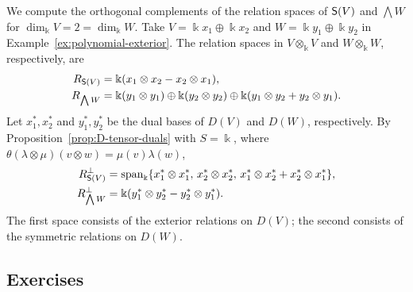 \begin{example}\label{ex:symmetric-orthogonals}
We compute the orthogonal complements of the relation spaces of $\mathsf{S}(V)$ and $\bigwedge W$ for $\dim_{\Bbbk}V=2=\dim_{\Bbbk}W$.
Take $V=\Bbbk x_1\oplus\Bbbk x_2$ and $W=\Bbbk y_1\oplus\Bbbk y_2$ in Example~\ref{ex:polynomial-exterior}.
The relation spaces in $V\otimes_\Bbbk V$ and $W\otimes_\Bbbk W$, respectively, are
\[
\begin{aligned}
R_{\mathsf{S}(V)}&=\Bbbk(x_1\otimes x_2-x_2\otimes x_1),\\
R_{\bigwedge W}&=\Bbbk(y_1\otimes y_1)\oplus\Bbbk(y_2\otimes y_2)\oplus\Bbbk(y_1\otimes y_2+y_2\otimes y_1).
\end{aligned}
\]
Let $x_1^*,x_2^*$ and $y_1^*,y_2^*$ be the dual bases of $D(V)$ and $D(W)$, respectively.
By Proposition~\ref{prop:D-tensor-duals} with $S=\Bbbk$, where $\theta(\lambda\otimes\mu)(v\otimes w)=\mu(v)\lambda(w)$,
\[
\begin{aligned}
R_{\mathsf{S}(V)}^\perp&=\operatorname{span}_\Bbbk\{x_1^*\otimes x_1^*,\,x_2^*\otimes x_2^*,\,x_1^*\otimes x_2^*+x_2^*\otimes x_1^*\},\\
R_{\bigwedge W}^\perp&=\Bbbk(y_1^*\otimes y_2^*-y_2^*\otimes y_1^*).
\end{aligned}
\]
The first space consists of the exterior relations on $D(V)$; the second consists of the symmetric relations on $D(W)$.
\end{example}

\subsection{Exercises}


